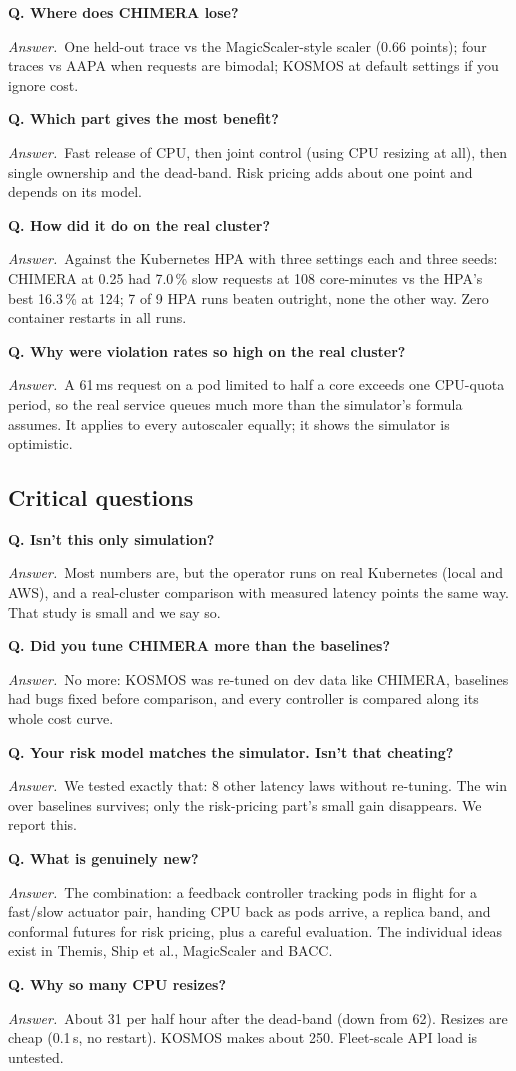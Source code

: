 \documentclass[11pt,a4paper]{article}
\newcommand{\Q}[1]{\par\medskip\textbf{Q. #1}\par}
\newcommand{\A}{\textit{Answer.}~}
\begin{document}
\Q{Where does CHIMERA lose?}
\A One held-out trace vs the MagicScaler-style scaler (0.66 points); four traces vs AAPA
when requests are bimodal; KOSMOS at default settings if you ignore cost.

\Q{Which part gives the most benefit?}
\A Fast release of CPU, then joint control (using CPU resizing at all), then single
ownership and the dead-band. Risk pricing adds about one point and depends on its model.

\Q{How did it do on the real cluster?}
\A Against the Kubernetes HPA with three settings each and three seeds: CHIMERA at 0.25
had 7.0\,\% slow requests at 108 core-minutes vs the HPA's best 16.3\,\% at 124; 7 of 9 HPA
runs beaten outright, none the other way. Zero container restarts in all runs.

\Q{Why were violation rates so high on the real cluster?}
\A A 61\,ms request on a pod limited to half a core exceeds one CPU-quota period, so the
real service queues much more than the simulator's formula assumes. It applies to every
autoscaler equally; it shows the simulator is optimistic.

\subsection*{Critical questions}
\Q{Isn't this only simulation?}
\A Most numbers are, but the operator runs on real Kubernetes (local and AWS), and a
real-cluster comparison with measured latency points the same way. That study is small and
we say so.

\Q{Did you tune CHIMERA more than the baselines?}
\A No more: KOSMOS was re-tuned on dev data like CHIMERA, baselines had bugs fixed before
comparison, and every controller is compared along its whole cost curve.

\Q{Your risk model matches the simulator. Isn't that cheating?}
\A We tested exactly that: 8 other latency laws without re-tuning. The win over baselines
survives; only the risk-pricing part's small gain disappears. We report this.

\Q{What is genuinely new?}
\A The combination: a feedback controller tracking pods in flight for a fast/slow actuator
pair, handing CPU back as pods arrive, a replica band, and conformal futures for risk
pricing, plus a careful evaluation. The individual ideas exist in Themis, Ship et al.,
MagicScaler and BACC.

\Q{Why so many CPU resizes?}
\A About 31 per half hour after the dead-band (down from 62). Resizes are cheap (0.1\,s, no
restart). KOSMOS makes about 250. Fleet-scale API load is untested.
\end{document}
